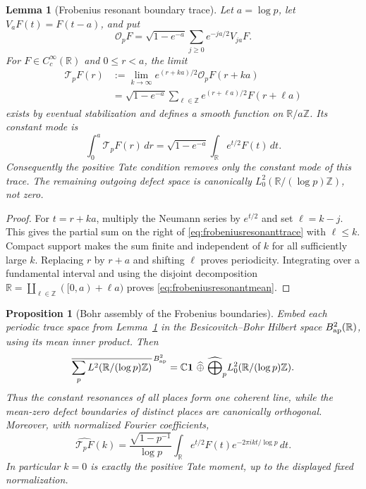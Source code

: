 \documentclass[11pt]{amsart}
\newtheorem{proposition}[theorem]{Proposition}
\newtheorem{lemma}[theorem]{Lemma}
\theoremstyle{definition}
\theoremstyle{remark}
\begin{document}
\begin{lemma}[Frobenius resonant boundary trace]
\label{lem:frobeniusresonanttrace}
Let $a=\log p$, let $V_aF(t)=F(t-a)$, and put
\[
 \mathcal O_pF=\sqrt{1-e^{-a}}
   \sum_{j\ge0}e^{-ja/2}V_{ja}F.
\]
For $F\in C_c^\infty(\mathbb R)$ and $0\le r<a$, the limit
\begin{equation}\label{eq:frobeniusresonanttrace}
 \begin{split}
 \mathcal T_pF(r)
 &:=\lim_{k\to\infty}e^{(r+ka)/2}
             \mathcal O_pF(r+ka)\\
 &=\sqrt{1-e^{-a}}\sum_{\ell\in\mathbb Z}
       e^{(r+\ell a)/2}F(r+\ell a)
 \end{split}
\end{equation}
exists by eventual stabilization and defines a smooth function on
$\mathbb R/a\mathbb Z$.  Its constant mode is
\begin{equation}\label{eq:frobeniusresonantmean}
 \int_0^a\mathcal T_pF(r)\,dr
 =\sqrt{1-e^{-a}}\int_{\mathbb R}e^{t/2}F(t)\,dt.
\end{equation}
Consequently the positive Tate condition removes only the constant mode of
this trace.  The remaining outgoing defect space is canonically
$L^2_0(\mathbb R/(\log p)\mathbb Z)$, not zero.
\end{lemma}

\begin{proof}
For $t=r+ka$, multiply the Neumann series by $e^{t/2}$ and set
$\ell=k-j$.  This gives the partial sum on the right of
\eqref{eq:frobeniusresonanttrace} with $\ell\le k$.  Compact support makes
the sum finite and independent of $k$ for all sufficiently large $k$.
Replacing $r$ by $r+a$ and shifting $\ell$ proves periodicity.  Integrating
over a fundamental interval and using the disjoint decomposition
$\mathbb R=\coprod_{\ell\in\mathbb Z}([0,a)+\ell a)$ proves
\eqref{eq:frobeniusresonantmean}.
\end{proof}

\begin{proposition}[Bohr assembly of the Frobenius boundaries]
\label{prop:bohrfrobeniusassembly}
Embed each periodic trace space from
Lemma~\ref{lem:frobeniusresonanttrace} in the Besicovitch--Bohr Hilbert
space $B^2_{\rm ap}(\mathbb R)$, using its mean inner product.  Then
\begin{equation}\label{eq:bohrfrobeniusassembly}
 \overline{\sum_p L^2(\mathbb R/(\log p)\mathbb Z)}^{\,B^2_{\rm ap}}
 =\mathbb C\mathbf1\ \widehat\oplus\
   \widehat\bigoplus_p
       L^2_0(\mathbb R/(\log p)\mathbb Z).
\end{equation}
Thus the constant resonances of all places form one coherent line, while
the mean-zero defect boundaries of distinct places are canonically
orthogonal.  Moreover, with normalized Fourier coefficients,
\begin{equation}\label{eq:frobeniusresonantfourier}
 \widehat{\mathcal T_pF}(k)
 =\frac{\sqrt{1-p^{-1}}}{\log p}
   \int_{\mathbb R}e^{t/2}F(t)
       e^{-2\pi ikt/\log p}\,dt .
\end{equation}
In particular $k=0$ is exactly the positive Tate moment, up to the displayed
fixed normalization.
\end{proposition}
\end{document}

